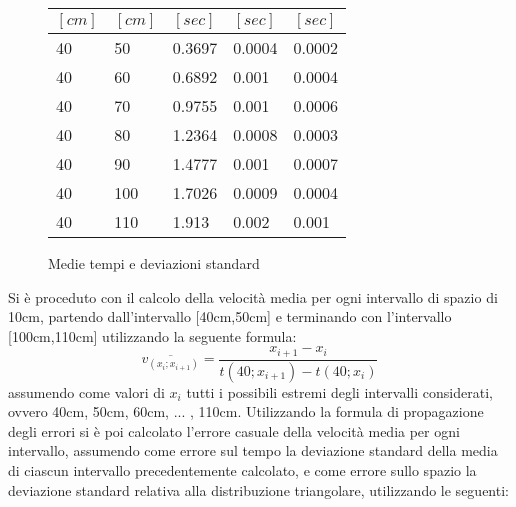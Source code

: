 \documentclass[a4paper,11pt,oneside]{article}
\begin{document}
\begin{figure}[h!]
{\begin{tabular}{m{0.7cm}m{0.7cm}|m{1.0cm}m{1.0cm}m{1.0cm}}
        $[\si{cm}]$&$[\si{cm}]$&$[\si{sec}]$&$[\si{sec}]$&$[\si{sec}]$\\
        \midrule
        40 & 50  & 0.3697  & 0.0004 & 0.0002 \\
        40 & 60  & 0.6892 & 0.001  & 0.0004 \\
        40 & 70  & 0.9755 & 0.001  & 0.0006 \\
        40 & 80  & 1.2364 & 0.0008 & 0.0003 \\
        40 & 90  & 1.4777 & 0.001  & 0.0007 \\
        40 & 100 & 1.7026 & 0.0009 & 0.0004 \\
        40 & 110 & 1.913 & 0.002  & 0.001 \\
        \bottomrule
    \end{tabular}
    \hspace{0.7cm}
    }
    \newline
    \caption{Medie tempi e deviazioni standard}
\end{figure}


Si è proceduto con il calcolo della velocità media per ogni intervallo di spazio di 10cm, partendo dall'intervallo [40cm,50cm] e terminando con l'intervallo [100cm,110cm] utilizzando la seguente formula:
\begin{equation*}
    \overline{v_{(x_i;x_{i+1})}}=\frac{x_{i+1}-x_i}{t(40;x_{i+1})-t(40;x_i)}
\end{equation*}
assumendo come valori di $x_i$ tutti i possibili estremi degli intervalli considerati, ovvero 40cm, 50cm, 60cm, ... , 110cm.
\newpage
Utilizzando la formula di propagazione degli errori si è poi calcolato l'errore casuale della velocità media per ogni intervallo, assumendo come errore sul tempo la deviazione standard della media di ciascun intervallo precedentemente calcolato, e come errore sullo spazio la deviazione standard relativa alla distribuzione triangolare, utilizzando le seguenti:
\end{document}
